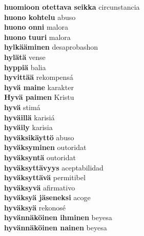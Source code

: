 \textbf{ huomioon otettava seikka  } circunstancia \\
\textbf{ huono kohtelu  } abuso \\
\textbf{ huono onni  } malora \\
\textbf{ huono tuuri  } malora \\
\textbf{ hylkääminen  } desaprobashon \\
\textbf{ hylätä  } vense \\
\textbf{ hyppiä  } balia \\
\textbf{ hyvittää  } rekompensá \\
\textbf{ hyvä maine  } karakter \\
\textbf{ Hyvä paimen  } Kristu \\
\textbf{ hyvä  } stimá \\
\textbf{ hyväillä  } karisiá \\
\textbf{ hyväily  } karisia \\
\textbf{ hyväksikäyttö  } abuso \\
\textbf{ hyväksyminen  } outoridat \\
\textbf{ hyväksyntä  } outoridat \\
\textbf{ hyväksyttävyys  } aceptabilidad \\
\textbf{ hyväksyttävä  } permitibel \\
\textbf{ hyväksyvä  } afirmativo \\
\textbf{ hyväksyä jäseneksi  } acoge \\
\textbf{ hyväksyä  } rekonosé \\
\textbf{ hyvännäköinen ihminen  } beyesa \\
\textbf{ hyvännäköinen nainen  } beyesa \\
